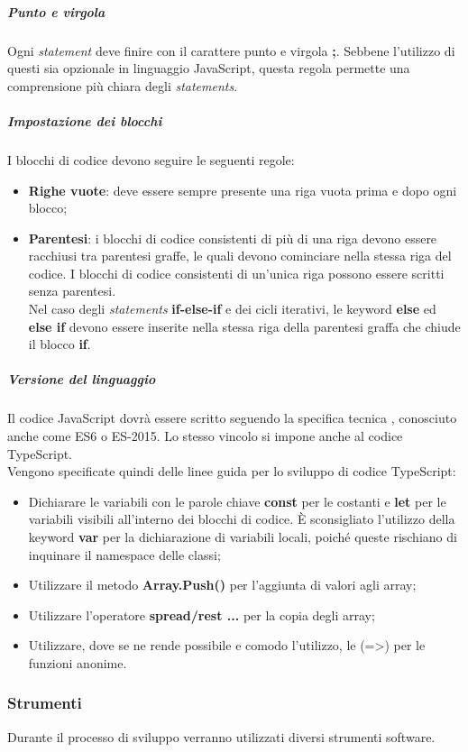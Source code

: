 \documentclass[../norme-di-progetto.tex]{subfiles}
\begin{document}
\subparagraph*{Punto e virgola}
Ogni \textit{statement} deve finire con il carattere punto e virgola \textbf{;}. Sebbene l'utilizzo di questi sia opzionale in linguaggio JavaScript, questa regola permette una comprensione più chiara degli \textit{statements}.

\subparagraph*{Impostazione dei blocchi}
I blocchi di codice devono seguire le seguenti regole:
\begin{itemize}
  \item \textbf{Righe vuote}: deve essere sempre presente una riga vuota prima e dopo ogni blocco;
  \item \textbf{Parentesi}: i blocchi di codice consistenti di più di una riga devono essere racchiusi tra parentesi graffe, le quali devono cominciare nella stessa riga del codice. I blocchi di codice consistenti di un'unica riga possono essere scritti senza parentesi. \\ Nel caso degli \textit{statements} \textbf{if-else-if} e dei cicli iterativi, le keyword \textbf{else} ed \textbf{else if} devono essere inserite nella stessa riga della parentesi graffa che chiude il blocco \textbf{if}.
\end{itemize}

\subparagraph{Versione del linguaggio}
Il codice JavaScript dovrà essere scritto seguendo la specifica tecnica , conosciuto anche come ES6 o ES-2015. Lo stesso vincolo si impone anche al codice TypeScript. \\
Vengono specificate quindi delle linee guida per lo sviluppo di codice TypeScript:
\begin{itemize}
  \item Dichiarare le variabili con le parole chiave \textbf{const} per le costanti e \textbf{let} per le variabili visibili all'interno dei blocchi di codice. È sconsigliato l'utilizzo della keyword \textbf{var} per la dichiarazione di variabili locali, poiché queste rischiano di inquinare il namespace delle classi;
  \item Utilizzare il metodo \textbf{Array.Push()} per l'aggiunta di valori agli array;
  \item Utilizzare l'operatore \textbf{spread/rest ...} per la copia degli array;
  \item Utilizzare, dove se ne rende possibile e comodo l'utilizzo, le  (=>) per le funzioni anonime.
\end{itemize}

\subsubsection{Strumenti}
Durante il processo di sviluppo verranno utilizzati diversi strumenti software.
\end{document}

